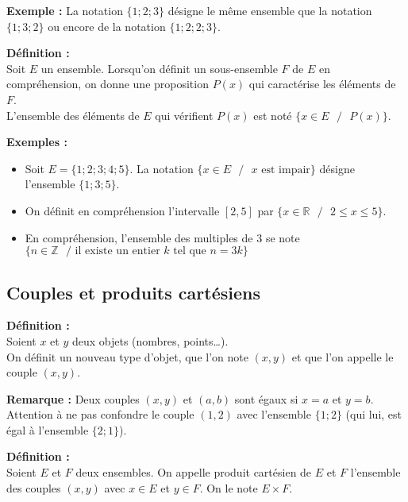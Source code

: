 \documentclass{article}
\begin{document}
\textbf{Exemple :} La notation $\{1; 2; 3\}$ désigne le même ensemble que la notation $\{1; 3; 2\}$ ou encore de la notation $\{1; 2; 2; 3\}$.
\vspace{4pt}
\begin{mdframed}[style=definitionStyle]
	\textbf{Définition :} ~\\
	Soit $E$ un ensemble. Lorsqu'on définit un sous-ensemble $F$ de $E$ en compréhension, on donne une proposition $P(x)$
	qui caractérise les éléments de $F$. \\
	L'ensemble des éléments de $E$ qui vérifient $P(x)$ est noté $\{x\in E \text{ }/\text{ } P(x)\}$.
\end{mdframed}

\textbf{Exemples :}
\begin{itemize}
	\item Soit $E=\{1; 2; 3; 4; 5\}$. La notation $\{x\in E \text{ }/\text{ } x \text{ est impair}\}$ désigne l'ensemble $\{1; 3; 5\}$.
	\item On définit en compréhension l'intervalle $[2, 5]$ par $\{ x\in\mathbb{R} \text{ }/\text{ } 2 \leq x \leq 5 \}$.
	\item En compréhension, l'ensemble des multiples de $3$ se note $\{ n\in\mathbb{Z} \text{ }/\text{ il existe un entier $k$ tel que } n=3k\}$
\end{itemize}

\subsection{Couples et produits cartésiens}

\begin{mdframed}[style=definitionStyle]
	\textbf{Définition :} ~\\
	Soient $x$ et $y$ deux objets (nombres, points\dots).\\
	On définit un nouveau type d'objet, que l'on note $(x,y)$ et que l'on appelle le couple $(x,y)$.
\end{mdframed}

\textbf{Remarque :} Deux couples $(x,y)$ et $(a,b)$ sont égaux si $x=a$ et $y=b$. Attention à ne pas confondre le couple
$(1,2)$ avec l'ensemble $\{1;2\}$ (qui lui, est égal à l'ensemble $\{ 2;1 \}$).

\begin{mdframed}[style=definitionStyle]
	\textbf{Définition :} ~\\
	Soient $E$ et $F$ deux ensembles. On appelle produit cartésien de $E$ et $F$ l'ensemble des couples $(x,y)$ avec
	$x\in E$ et $y\in F$. On le note $E\times F$.
\end{mdframed}
\end{document}
